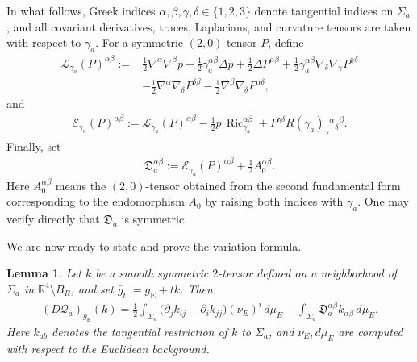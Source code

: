 \documentclass[10pt]{amsart}
\newcommand{\R}{\mathbb{R}}
\newcommand{\gE}{g_{\mathrm{E}}}
\newcommand{\Ric}{\operatorname{Ric}}
\theoremstyle{plain}
\newtheorem{lemma}[theorem]{Lemma}
\theoremstyle{remark}
\begin{document}
	In what follows, Greek indices
	$\alpha,\beta,\gamma,\delta\in\{1,2,3\}$ denote tangential indices on
	$\Sigma_a$, and all covariant derivatives, traces, Laplacians, and curvature
	tensors are taken with respect to $\gamma_a$. For a symmetric $(2,0)$-tensor
	$P$, define
	\begin{align*}
		\mathcal L_{\gamma_a}(P)^{\alpha\beta}
		:={}&
		\frac12\nabla^\alpha\nabla^\beta p
		-
		\frac12\gamma_a^{\alpha\beta}\Delta p
		+
		\frac12\Delta P^{\alpha\beta}
		+
		\frac12\gamma_a^{\alpha\beta}
		\nabla_\delta\nabla_\gamma P^{\gamma\delta}
		\\
		&-
		\frac12\nabla^\alpha\nabla_\delta P^{\delta\beta}
		-
		\frac12\nabla^\beta\nabla_\delta P^{\alpha\delta},
	\end{align*}
	and
	\begin{align}\label{eq:BY-def-EP}
		\mathcal E_{\gamma_a}(P)^{\alpha\beta}
		:=
		\mathcal L_{\gamma_a}(P)^{\alpha\beta}
		-
		\frac12p\,\Ric_{\gamma_a}^{\alpha\beta}
		+
		P^{\gamma\delta}
		R(\gamma_a)_\gamma{}^\alpha{}_\delta{}^\beta.
	\end{align}
	Finally, set
	\begin{align}\label{eq:BY-def-D}
		\mathfrak D_a^{\alpha\beta}
		:=
		\mathcal E_{\gamma_a}(P)^{\alpha\beta}
		+
		\frac12A_0^{\alpha\beta}.
	\end{align}
	Here $A_0^{\alpha\beta}$ means the $(2,0)$-tensor obtained from the second fundamental form corresponding to the endomorphism $A_0$ by raising both indices with $\gamma_a$. One may verify directly that $\mathfrak D_a$ is symmetric.
	
	We are now ready to state and prove the variation formula.
	
	\begin{lemma}\label{lem:BY-first-variation-general-hypersurface}
		Let $k$ be a smooth symmetric $2$-tensor defined on a neighborhood of $\Sigma_a$ in $\R^4\setminus B_R$, and set $\bar g_t:=\gE+tk$. Then
		\begin{align}\label{eq:BY-first-variation-with-defect-Q}
			(D\mathcal Q_a)_{\gE}(k)
			=
			\frac12
			\int_{\Sigma_a}
			\bigl(
			\partial_j k_{ij}
			-
			\partial_i k_{jj}
			\bigr)(\nu_E)^i\,d\mu_E
			+
			\int_{\Sigma_a}
			\mathfrak D_a^{\alpha\beta}k_{\alpha\beta}\,d\mu_E .
		\end{align}
		Here $k_{ab}$ denotes the tangential restriction of $k$ to $\Sigma_a$, and
		$\nu_E,d\mu_E$ are computed with respect to the Euclidean background.
	\end{lemma}
	
\end{document}
